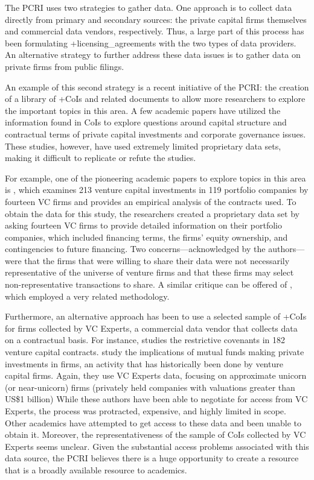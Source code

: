 \documentclass[
]{book}
\begin{document}
The PCRI uses two strategies to gather data. One approach is to collect data directly from primary and secondary sources: the private capital firms themselves and commercial data vendors, respectively. Thus, a large part of this process has been formulating +licensing\_agreements\textbar{} with the two types of data providers. An alternative strategy to further address these data issues is to gather data on private firms from public filings.

An example of this second strategy is a recent initiative of the PCRI: the creation of a library of +CoIs\textbar{} and related documents to allow more researchers to explore the important topics in this area. A few academic papers have utilized the information found in CoIs to explore questions around capital structure and contractual terms of private capital investments and corporate governance issues. These studies, however, have used extremely limited proprietary data sets, making it difficult to replicate or refute the studies.

For example, one of the pioneering academic papers to explore topics in this area is \citet{kaplan2003}, which examines 213 venture capital investments in 119 portfolio companies by fourteen VC firms and provides an empirical analysis of the contracts used. To obtain the data for this study, the researchers created a proprietary data set by asking fourteen VC firms to provide detailed information on their portfolio companies, which included financing terms, the firms' equity ownership, and contingencies to future financing. Two concerns---acknowledged by the authors---were that the firms that were willing to share their data were not necessarily representative of the universe of venture firms and that these firms may select non-representative transactions to share. A similar critique can be offered of \citet{lerner2005}, which employed a very related methodology.

Furthermore, an alternative approach has been to use a selected sample of +CoIs\textbar{} for firms collected by VC Experts, a commercial data vendor that collects data on a contractual basis. For instance, \citet{bengtsson2011} studies the restrictive covenants in 182 venture capital contracts. \citet{chernenko2019} study the implications of mutual funds making private investments in firms, an activity that has historically been done by venture capital firms. Again, they use VC Experts data, focusing on approximate unicorn (or near-unicorn) firms (privately held companies with valuations greater than US\$1 billion) While these authors have been able to negotiate for access from VC Experts, the process was protracted, expensive, and highly limited in scope. Other academics have attempted to get access to these data and been unable to obtain it. Moreover, the representativeness of the sample of CoIs collected by VC Experts seems unclear. Given the substantial access problems associated with this data source, the PCRI believes there is a huge opportunity to create a resource that is a broadly available resource to academics.
\end{document}

